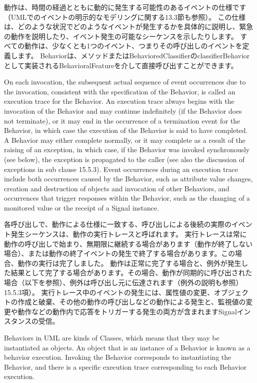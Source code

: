 \documentclass[a4paper,11pt]{ltjsarticle}
\begin{document}
動作は、時間の経過とともに動的に発生する可能性のあるイベントの仕様です（UMLでのイベントの明示的なモデリングに関する13.3節も参照）。
この仕様は、どのような状況でどのようなイベントが発生するかを具体的に説明し、緊急の動作を説明したり、イベント発生の可能なシーケンスを示したりします。
すべての動作は、少なくとも1つのイベント、つまりその呼び出しのイベントを定義します。
Behaviorは、メソッドまたはBehavioredClassifierのclassifierBehaviorとして実装されるBehavioralFeatureを介して直接呼び出すことができます。

On each invocation, the subsequent actual sequence of event occurrences due to the invocation, consistent with the specification of the Behavior, is called an execution trace for the Behavior. 
An execution trace always begins with the invocation of the Behavior and may continue indefinitely (if the Behavior does not terminate), or it may end in the occurrence of a termination event for the Behavior, in which case the execution of the Behavior is said to have completed. 
A Behavior may either complete normally, or it may complete as a result of the raising of an exception, in which case, if the Behavior was invoked synchronously (see below), the exception is propagated to the caller (see also the discussion of exceptions in sub clause 15.5.3). 
Event occurrences during an execution trace include both occurrences caused by the Behavior, such as attribute value changes, creation and destruction of objects and invocation of other Behaviors, and occurrences that trigger responses within the Behavior, such as the changing of a monitored value or the receipt of a Signal instance.

各呼び出しで、動作による仕様に一致する、呼び出しによる後続の実際のイベント発生シーケンスは、動作の実行トレースと呼ばれます。
実行トレースは常に動作の呼び出しで始まり、無期限に継続する場合があります（動作が終了しない場合）、または動作の終了イベントの発生で終了する場合があります。この場合、動作の実行は完了しました。
動作は正常に完了する場合と、例外が発生した結果として完了する場合があります。その場合、動作が同期的に呼び出された場合（以下を参照）、例外は呼び出し元に伝達されます（例外の説明も参照） 15.5.3項）。
実行トレース中のイベントの発生には、属性値の変更、オブジェクトの作成と破棄、その他の動作の呼び出しなどの動作による発生と、監視値の変更や動作などの動作内で応答をトリガーする発生の両方が含まれますSignalインスタンスの受信。

Behaviors in UML are kinds of Classes, which means that they may be instantiated as objects. 
An object that is an instance of a Behavior is known as a behavior execution. Invoking the Behavior corresponds to instantiating the Behavior, and there is a specific execution trace corresponding to each Behavior execution.
\end{document}

